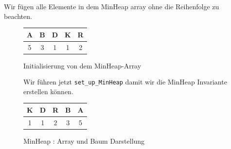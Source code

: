 \documentclass[course=erap]{aspdoc}
\begin{document}
\begin{enumerate}
\item Wir fügen alle Elemente in dem MinHeap array ohne die Reihenfolge zu beachten.
\begin{figure}[H]
\centering
\captionsetup{justification=centering}
\begin{table}[H]
\centering

\begin{tabular}{||c | c | c | c | c||} 
 \hline
A & B & D & K & R \\ [0.5ex]
 \hline
5 & 3 & 1 & 1 & 2 \\ [0.5ex]
\hline
\end{tabular}
\end{table}
\caption{Initialisierung von dem MinHeap-Array}
\end{figure}

\begin{figure}[H]
\centering
\captionsetup{justification=centering}
\begin{table}[H]
\item Wir führen jetzt \verb+set_up_MinHeap+ damit wir die MinHeap Invariante erstellen können.
\centering
\begin{minipage}{0.4\textwidth} 
\begin{tabular}{||c | c | c | c | c||} 
 \hline
K & D & R & B & A \\ [0.5ex]
 \hline
1 & 1 & 2 & 3 & 5 \\ [0.5ex]
\hline
\end{tabular} 
\end{minipage} 
\quad
\vspace{\baselineskip} 
\begin{minipage}{0.4\textwidth} 
\end{minipage} 
\end{table}

\caption{MinHeap : Array und Baum Darstellung}
\end{figure}


\end{enumerate}
\end{document}
